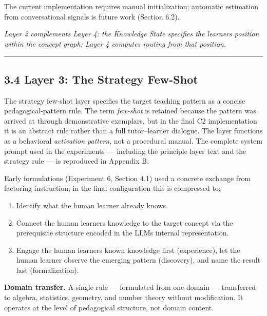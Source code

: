 \documentclass[
]{article}
\providecommand{\tightlist}{%
  \setlength{\itemsep}{0pt}\setlength{\parskip}{0pt}}
\begin{document}
The current implementation requires manual initialization; automatic estimation from conversational signals is future work (Section 6.2).

\emph{Layer 2 complements Layer 4: the Knowledge State specifies the learner\textquotesingle s position within the concept graph; Layer 4 computes routing from that position.}

\begin{center}\rule{0.5\linewidth}{0.5pt}\end{center}

\subsection{3.4 Layer 3: The Strategy Few-Shot}\label{34-layer-3-the-strategy-few-shot}

The strategy few-shot layer specifies the target teaching pattern as a concise pedagogical-pattern rule. The term \emph{few-shot} is retained because the pattern was arrived at through demonstrative exemplars, but in the final C2 implementation it is an abstract rule rather than a full tutor--learner dialogue. The layer functions as a behavioral \emph{activation pattern}, not a procedural manual. The complete system prompt used in the experiments --- including the principle layer text and the strategy rule --- is reproduced in Appendix B.

Early formulations (Experiment 6, Section 4.1) used a concrete exchange from factoring instruction; in the final configuration this is compressed to:

\begin{enumerate}
\def\labelenumi{\arabic{enumi}.}
\tightlist
\item
  Identify what the human learner already knows.
\item
  Connect the human learner\textquotesingle s knowledge to the target concept via the prerequisite structure encoded in the LLM\textquotesingle s internal representation.
\item
  Engage the human learner\textquotesingle s known knowledge first (experience), let the human learner observe the emerging pattern (discovery), and name the result last (formalization).
\end{enumerate}

\textbf{Domain transfer.} A single rule --- formulated from one domain --- transferred to algebra, statistics, geometry, and number theory without modification. It operates at the level of pedagogical structure, not domain content.
\end{document}
